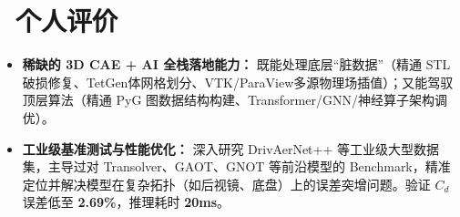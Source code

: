 \documentclass[11pt]{article}
\begin{document}
\section{\makebox[\widthof{\faUser}][c]{\color{CVBlue}\faUser}\ 个人评价}

\begin{itemize}
    \item \textbf{稀缺的 3D CAE + AI 全栈落地能力：} 既能处理底层“脏数据”（精通 STL破损修复、TetGen体网格划分、VTK/ParaView多源物理场插值）；又能驾驭顶层算法（精通 PyG 图数据结构构建、Transformer/GNN/神经算子架构调优）。
    \item \textbf{工业级基准测试与性能优化：} 深入研究 DrivAerNet++ 等工业级大型数据集，主导过对 Transolver、GAOT、GNOT 等前沿模型的 Benchmark，精准定位并解决模型在复杂拓扑（如后视镜、底盘）上的误差突增问题。验证 $C_d$ 误差低至 \textbf{2.69\%}，推理耗时 \textbf{20ms}。
\end{itemize}
\end{document}
